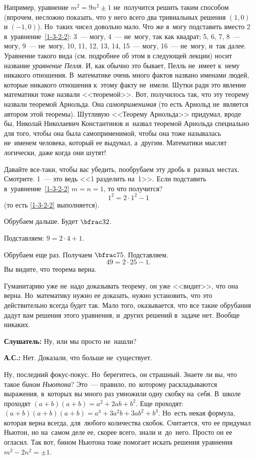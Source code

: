 Например, уравнение $m^{2} = 9n^{2}\pm 1$ не~получится решить таким способом
(впрочем, несложно показать, что у него всего два тривиальных решения $(1,0)$ и $(-1,0)$).
Но~таких чисел довольно мало.
Что же я~могу подставить вместо 2 в~уравнение~\eqref{1-3-2-2}: 3~--- могу, 4~--- не~могу, так как квадрат;
5, 6, 7, 8~--- могу, 9~--- не~могу, 10, 11, 12, 13, 14, 15~--- могу, 16~--- не~могу, и~так далее.
Уравнение такого вида (см. подробнее об этом в следующей лекции) носит название \textit{уравнение Пелля}. И, как обычно это бывает, Пелль не~имеет
к~нему никакого отношения. В~математике очень много фактов названо именами людей, которые никакого
отношения к~этому факту не~имели. Шутки ради это явление математики тоже назвали <<теоремой>>. Вот,
получилось так, что эту теорему назвали теоремой Арнольда. Она \textit{самоприменимая} (то есть Арнольд
не~является автором этой теоремы). Шутливую <<Теорему Арнольда>> придумал, вроде бы, Николай Николаевич
Константинов и~назвал теоремой Арнольда специально для того, чтобы она была самоприменимой, чтобы она тоже
называлась не~именем человека, который ее выдумал, а~другим.
 Математики мыслят логически, даже
когда они шутят!

Давайте все-таки, чтобы вас убедить, пообрубаем эту дробь в~разных местах. Смотрите. 1~--- это
ведь <<1 разделить на~1>>. Если подставить в~уравнение~\eqref{1-3-2-2} $m=n=1$, то что получится?
$$
1^{2} = 2\cdot1^{2}-1
$$
(то есть \eqref{1-3-2-2} выполняется).

Обрубаем дальше. Будет $\bfrac32$.

Подставляем: $9=2\cdot 4+1$.

Обрубаем еще раз. Получаем $\bfrac75$. Подставляем.
$$
49=2\cdot25-1.
$$
Вы видите, что теорема верна.

Гуманитарию уже не~надо доказывать теорему, он уже <<видит>>, что она верна. Но~математику нужно ее
доказать, нужно установить, что это действительно всегда будет так. Мало того, оказывается, что все
такие обрубания дадут вам решения этого уравнения, и~других решений в~задаче нет. Вообще никаких.

\textbf{Слушатель:} Ну, или мы просто не~нашли?

\textbf{А.С.:} Нет. Доказали, что больше не~существует.

Ну, последний фокус-покус. Но~берегитесь, он страшный. Знаете ли вы, что такое \textit{бином Ньютона}?
Это~--- правило, по~которому раскладываются выражения, в~которых вы много раз умножили одну скобку
на~себя. В~школе проходят $(a+b)(a+b)=a^{2}+2ab+b^{2}$. Еще проходят: $(a+b)(a+b)(a+b)=a^{3}+3a^{2}b+3ab^{2}+b^{3}$.
Но~есть некая формула, которая верна всегда, для~любого количества скобок. Считается, что ее
придумал Ньютон, но на~самом деле ее, скорее всего, знали и~до~него. Просто он ее огласил.
Так вот, бином Ньютона тоже помогает искать решения уравнения $m^{2}-2n^{2}=\pm1$.

